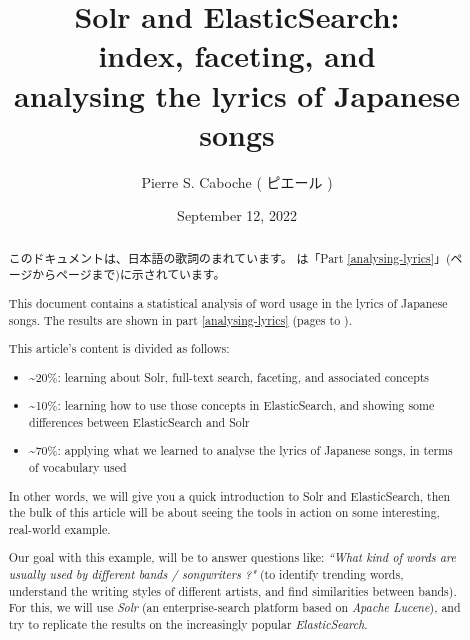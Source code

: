 \documentclass[twoside]{article}
\title{
Solr and ElasticSearch:
\\ 
index, faceting, and 
\\
analysing the lyrics of Japanese songs}
\author{Pierre S. Caboche ( \furi{南瓜/カボチャ}ピエール )}
\date{
	September 12, 2022 \\
}
\begin{document}
\maketitle



\begin{abstract}

\bigskip

このドキュメントは、日本語の歌詞のまれています。 は「Part \ref{analysing-lyrics}」(\pageref*{analysing-lyrics}ページから\pageref*{analysing-lyrics-end}ページまで)に示されています。

This document contains a statistical analysis of word usage in the lyrics of Japanese songs. The results are shown in part \ref{analysing-lyrics} (pages \pageref*{analysing-lyrics} to \pageref*{analysing-lyrics-end}). \\
	
\bigskip
	

This article's content is divided as follows:
\begin{itemize}
	\item \textasciitilde 20\%: learning about Solr, full-text search, faceting, and associated concepts
	\item \textasciitilde 10\%: learning how to use those concepts in ElasticSearch, and showing some differences between ElasticSearch and Solr
	\item \textasciitilde 70\%: applying what we learned to analyse the lyrics of Japanese songs, in terms of vocabulary used
\end{itemize}	

\bigskip

In other words, we will give you a quick introduction to Solr and ElasticSearch, then the bulk of this article will be about seeing the tools in action on some interesting, real-world example.

Our goal with this example, will be to answer questions like: \emph{``What kind of words are usually used by different bands / songwriters ?"} (to identify trending words, understand the writing styles of different artists, and find similarities between bands). \\

For this, we will use \emph{Solr} (an enterprise-search platform based on \emph{Apache Lucene}), and try to replicate the results on the increasingly popular \emph{ElasticSearch}.


\end{abstract}
\end{document}
